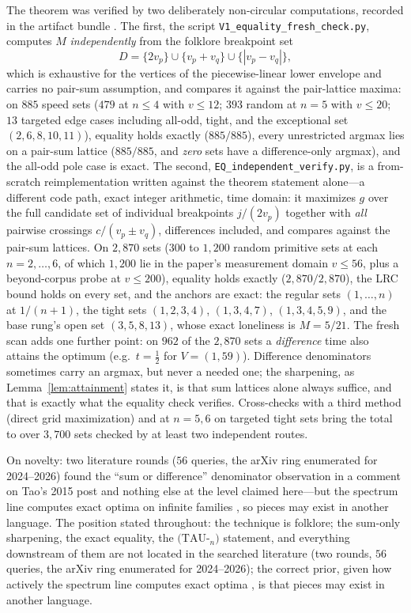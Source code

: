\documentclass[11pt,a4paper]{article}
\numberwithin{equation}{section}
\theoremstyle{plain}
\theoremstyle{plain}
\theoremstyle{definition}
\theoremstyle{remark}
\begin{document}
The theorem was verified by two deliberately non-circular computations,
recorded in the artifact bundle \cite{prog-artifacts}. The first, the
script \texttt{V1\_equality\_fresh\_check.py}, computes $M$
\emph{independently} from the folklore breakpoint set
\[
D=\{2v_p\}\cup\{v_p+v_q\}\cup\{|v_p-v_q|\},
\]
which is exhaustive for the vertices of the piecewise-linear lower
envelope and carries no pair-sum assumption, and compares it against the
pair-lattice maxima: on $885$ speed sets ($479$ at $n\le 4$ with
$v\le 12$; $393$ random at $n=5$ with $v\le 20$; $13$ targeted edge
cases including all-odd, tight, and the exceptional set
$(2,6,8,10,11)$), equality holds exactly ($885/885$), every unrestricted
argmax lies on a pair-sum lattice ($885/885$, and \emph{zero} sets have
a difference-only argmax), and the all-odd pole case is exact. The
second, \texttt{EQ\_independent\_verify.py}, is a from-scratch
reimplementation written against the theorem statement alone---a
different code path, exact integer arithmetic, time domain: it maximizes
$g$ over the full candidate set of individual breakpoints $j/(2v_p)$
together with \emph{all} pairwise crossings $c/(v_p\pm v_q)$, differences
included, and compares against the pair-sum lattices. On $2{,}870$ sets
($300$ to $1{,}200$ random primitive sets at each $n=2,\dots,6$, of which
$1{,}200$ lie in the paper's measurement domain $v\le 56$, plus a
beyond-corpus probe at $v\le 200$), equality holds exactly
($2{,}870/2{,}870$), the LRC bound holds on every set, and the anchors
are exact: the regular sets $(1,\dots,n)$ at $1/(n{+}1)$, the tight sets
$(1,2,3,4)$, $(1,3,4,7)$, $(1,3,4,5,9)$, and the base rung's open set
$(3,5,8,13)$, whose exact loneliness is $M=5/21$. The fresh scan adds
one further point: on $962$ of the $2{,}870$ sets a \emph{difference}
time also attains the optimum (e.g.\ $t=\tfrac12$ for $V=(1,59)$).
Difference denominators sometimes carry an argmax, but never a needed
one; the sharpening, as Lemma~\ref{lem:attainment} states it, is that
sum lattices alone always suffice, and that is exactly what the
equality check verifies. Cross-checks with a third method (direct grid
maximization) and at $n=5,6$ on targeted tight sets bring the total to
over $3{,}700$ sets checked by at least two independent routes.

On novelty: two literature rounds ($56$ queries, the arXiv ring
enumerated for 2024--2026) found the ``sum or difference'' denominator
observation in a comment on Tao's 2015 post \cite{Tao-blog} and nothing
else at the level claimed here---but the spectrum line computes exact
optima on infinite families \cite{Cordella}, so pieces may exist in
another language. The position stated throughout: the
technique is folklore; the sum-only sharpening, the exact equality, the
$(\mathrm{TAU}$-$_n)$ statement, and everything downstream of them are
not located in the searched literature (two rounds, $56$ queries, the
arXiv ring enumerated for 2024--2026); the correct prior, given how
actively the spectrum line computes exact optima \cite{Cordella}, is
that pieces may exist in another language.
\end{document}
